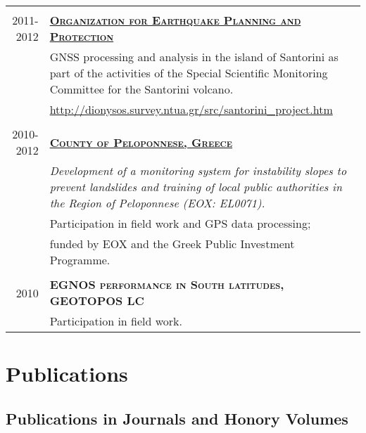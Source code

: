 \documentclass[a4paper,10pt]{article} %
\begin{document}
\begin{longtable}{r|p{13cm}}
\multicolumn{2}{c}{} \\
\textsc{2011-2012} & \textbf{\textsc{\href{http://www.oasp.gr/}{Organization for Earthquake Planning and Protection}}}\\
  & GNSS processing and analysis in the island of Santorini as part of the activities of the Special Scientific Monitoring Committee for the Santorini volcano.\\
  & \url{http://dionysos.survey.ntua.gr/src/santorini_project.htm}\\

\multicolumn{2}{c}{}\\
\textsc{2010-2012} & \textbf{\textsc{\href{http://www.landslides.gr/index.php?lang=en}{County of Peloponnese, Greece}}}\\
  & \textit{Development of a monitoring system for instability slopes to prevent landslides and training of local public authorities in the Region of Peloponnese (EOX: EL0071).}\\
  & Participation in field work and GPS data processing;\\
  & funded by EOX and the Greek Public Investment Programme.\\

\multicolumn{2}{c}{}\\
\textsc{2010} & \textbf{\textsc{EGNOS performance in South latitudes, GEOTOPOS LC}}\\
  & Participation in field work.\\

\end{longtable}
\medskip

\section{Publications}
\medskip

\subsection*{Publications in Journals and Honory Volumes}
\end{document}

